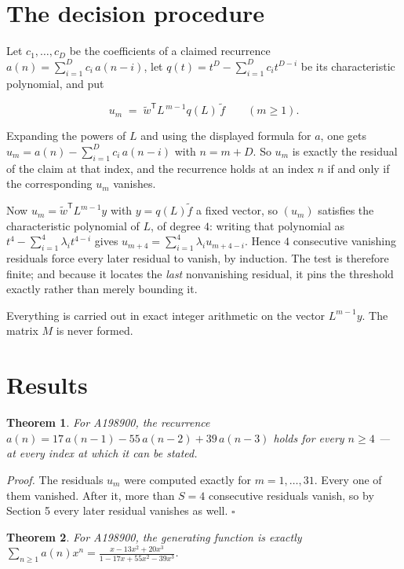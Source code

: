 \documentclass[11pt]{article}
\newtheorem{theorem}{Theorem}
\theoremstyle{definition}
\begin{document}
\section{The decision procedure}

Let $c_1,\dots,c_D$ be the coefficients of a claimed recurrence $a(n) = \sum_{i=1}^{D} c_i\,a(n-i)$, let $q(t) = t^{D} - \sum_{i=1}^{D} c_i t^{D-i}$ be its characteristic polynomial, and put

\[u_m \;=\; \tilde w^{\mathsf T} L^{\,m-1} q(L)\,\tilde f \qquad (m \ge 1).\]

Expanding the powers of $L$ and using the displayed formula for $a$, one gets $u_m = a(n) - \sum_{i=1}^{D} c_i\,a(n-i)$ with $n = m + D$. So $u_m$ is exactly the residual of the claim at that index, and the recurrence holds at an index $n$ if and only if the corresponding $u_m$ vanishes.

Now $u_m = \tilde w^{\mathsf T} L^{m-1} y$ with $y = q(L)\tilde f$ a fixed vector, so $(u_m)$ satisfies the characteristic polynomial of $L$, of degree $4$: writing that polynomial as $t^{4} - \sum_{i=1}^{4} \lambda_i t^{4-i}$ gives $u_{m+4} = \sum_{i=1}^{4} \lambda_i u_{m+4-i}$. Hence $4$ consecutive vanishing residuals force every later residual to vanish, by induction. The test is therefore finite; and because it locates the {\itshape last} nonvanishing residual, it pins the threshold exactly rather than merely bounding it.

Everything is carried out in exact integer arithmetic on the vector $L^{m-1}y$. The matrix $M$ is never formed.

\section{Results}

\begin{theorem} For A198900, the recurrence $a(n) = 17\,a(n-1) - 55\,a(n-2) + 39\,a(n-3)$ holds for every $n \ge 4$ --- at every index at which it can be stated.\end{theorem}

{\itshape Proof.} The residuals $u_m$ were computed exactly for $m = 1,\dots,31$. Every one of them vanished. After it, more than $S = 4$ consecutive residuals vanish, so by Section 5 every later residual vanishes as well. $\square$

\begin{theorem} For A198900, the generating function is exactly $\sum_{n\ge 1} a(n)x^n = \frac{x - 13x^{2} + 20x^{3}}{1 - 17x + 55x^{2} - 39x^{3}}$.\end{theorem}
\end{document}
